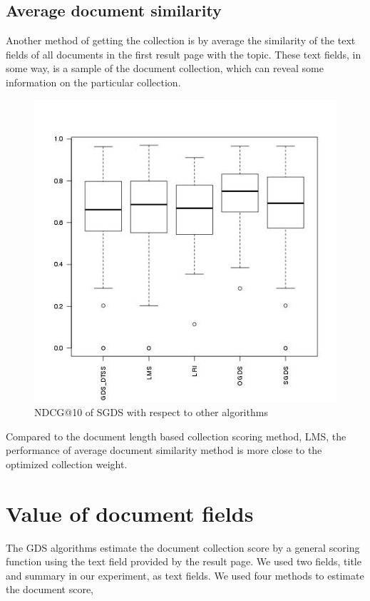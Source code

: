 \subsection{Average document similarity}
Another method of getting the collection is by average the similarity of the text fields of all documents in the first result page with the topic. These text fields, in some way, is a sample of the document collection, which can reveal some information on the particular collection. 
 \begin{figure}
\begin{center}
\includegraphics[scale=0.6]{images/SGDS}
\caption{NDCG@10 of SGDS with respect to other algorithms}
\label{fig:sgds}
\end{center}
\end{figure}



Compared to the document length based collection scoring method, LMS, the performance of average document similarity method is more close to the optimized collection weight.
\section{Value of document fields}
The GDS algorithms estimate the document collection score by a general scoring function using the text field provided by the result page. We used two fields, title and summary in our experiment, as text fields. We used four methods to estimate the document score, 

